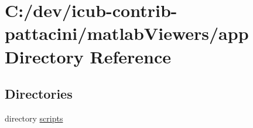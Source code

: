 \section{C\+:/dev/icub-\/contrib-\/pattacini/matlab\+Viewers/app Directory Reference}
\label{dir_e91a887e2f6487024fb4b5250673d8ec}
\subsection*{Directories}
\begin{DoxyCompactItemize}
\item 
directory \hyperlink{dir_64961f17a3708b3df53571064252b2d4}{scripts}
\end{DoxyCompactItemize}
